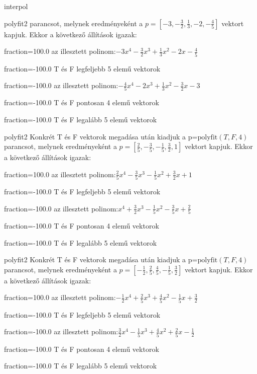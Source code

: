 \documentclass[12pt]{article}
\begin{document}
\begin{quiz}{interpol}
\begin{multi}[multiple]{polyfit2}
parancsot, melynek eredményeként a $p=\left[-3,-\frac{3}{2},\frac{1}{3},-2,-\frac{4}{5}\right]$ vektort kapjuk.
Ekkor a következő állítások igazak:
\item[fraction=100.0] az illesztett polinom:$-3x^4-\frac{3}{2}x^3+\frac{1}{3}x^2-2x-\frac{4}{5}$
\item[fraction=-100.0]  T és F legfeljebb 5 elemű vektorok
\item[fraction=-100.0]  az illesztett polinom:$-\frac{4}{5}x^4-2x^3+\frac{1}{3}x^2-\frac{3}{2}x-3$
\item[fraction=-100.0]  T és F pontosan 4 elemű vektorok
\item[fraction=-100.0] T és F legalább 5 elemű vektorok
\end{multi}
\begin{multi}[multiple]{polyfit2}
Konkrét T és F vektorok megadása után kiadjuk a p=$\mathrm{polyfit}(T,F,4)$
parancsot, melynek eredményeként a $p=\left[\frac{2}{5},-\frac{3}{5},-\frac{1}{5},\frac{3}{2},1\right]$ vektort kapjuk.
Ekkor a következő állítások igazak:
\item[fraction=100.0] az illesztett polinom:$\frac{2}{5}x^4-\frac{3}{5}x^3-\frac{1}{5}x^2+\frac{3}{2}x+1$
\item[fraction=-100.0]  T és F legfeljebb 5 elemű vektorok
\item[fraction=-100.0]  az illesztett polinom:$x^4+\frac{3}{2}x^3-\frac{1}{5}x^2-\frac{3}{5}x+\frac{2}{5}$
\item[fraction=-100.0]  T és F pontosan 4 elemű vektorok
\item[fraction=-100.0] T és F legalább 5 elemű vektorok
\end{multi}
\begin{multi}[multiple]{polyfit2}
Konkrét T és F vektorok megadása után kiadjuk a p=$\mathrm{polyfit}(T,F,4)$
parancsot, melynek eredményeként a $p=\left[-\frac{1}{2},\frac{2}{5},\frac{4}{5},-\frac{1}{5},\frac{3}{2}\right]$ vektort kapjuk.
Ekkor a következő állítások igazak:
\item[fraction=100.0] az illesztett polinom:$-\frac{1}{2}x^4+\frac{2}{5}x^3+\frac{4}{5}x^2-\frac{1}{5}x+\frac{3}{2}$
\item[fraction=-100.0]  T és F legfeljebb 5 elemű vektorok
\item[fraction=-100.0]  az illesztett polinom:$\frac{3}{2}x^4-\frac{1}{5}x^3+\frac{4}{5}x^2+\frac{2}{5}x-\frac{1}{2}$
\item[fraction=-100.0]  T és F pontosan 4 elemű vektorok
\item[fraction=-100.0] T és F legalább 5 elemű vektorok

\end{multi}
\end{quiz}
\end{document}
